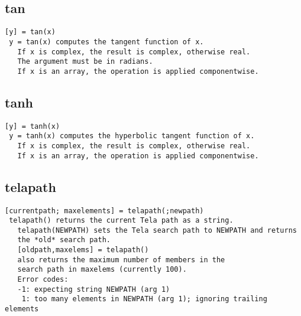 \documentclass[a4paper]{article}
\begin{document}
\subsection{tan\label{tan}}

\begin{tscreen}
\begin{verbatim}
[y] = tan(x)
 y = tan(x) computes the tangent function of x.
   If x is complex, the result is complex, otherwise real.
   The argument must be in radians.
   If x is an array, the operation is applied componentwise.
\end{verbatim}
\end{tscreen}





\subsection{tanh\label{tanh}}

\begin{tscreen}
\begin{verbatim}
[y] = tanh(x)
 y = tanh(x) computes the hyperbolic tangent function of x.
   If x is complex, the result is complex, otherwise real.
   If x is an array, the operation is applied componentwise.
\end{verbatim}
\end{tscreen}





\subsection{telapath\label{telapath}}

\begin{tscreen}
\begin{verbatim}
[currentpath; maxelements] = telapath(;newpath)
 telapath() returns the current Tela path as a string.
   telapath(NEWPATH) sets the Tela search path to NEWPATH and returns
   the *old* search path.
   [oldpath,maxelems] = telapath()
   also returns the maximum number of members in the
   search path in maxelems (currently 100).
   Error codes:
   -1: expecting string NEWPATH (arg 1)
    1: too many elements in NEWPATH (arg 1); ignoring trailing elements
\end{verbatim}
\end{tscreen}
\end{document}
